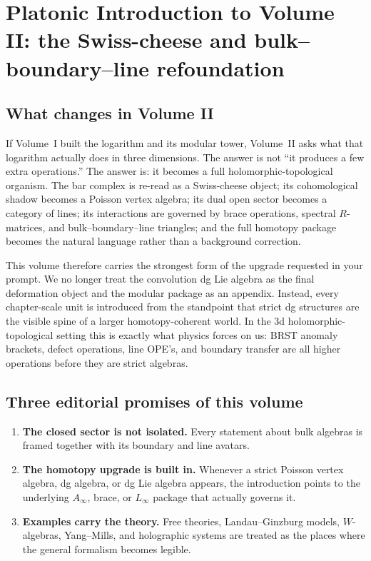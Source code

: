 
\chapter*{Platonic Introduction to Volume II: the Swiss-cheese and bulk--boundary--line refoundation}

\section*{What changes in Volume II}

If Volume~I built the logarithm and its modular tower, Volume~II asks what that logarithm actually does in three dimensions.  The answer is not ``it produces a few extra operations.''  The answer is: it becomes a full holomorphic-topological organism.  The bar complex is re-read as a Swiss-cheese object; its cohomological shadow becomes a Poisson vertex algebra; its dual open sector becomes a category of lines; its interactions are governed by brace operations, spectral $R$-matrices, and bulk--boundary--line triangles; and the full homotopy package becomes the natural language rather than a background correction.

This volume therefore carries the strongest form of the upgrade requested in your prompt.  We no longer treat the convolution dg Lie algebra as the final deformation object and the modular package as an appendix.  Instead, every chapter-scale unit is introduced from the standpoint that strict dg structures are the visible spine of a larger homotopy-coherent world.  In the 3d holomorphic-topological setting this is exactly what physics forces on us: BRST anomaly brackets, defect operations, line OPE's, and boundary transfer are all higher operations before they are strict algebras.

\section*{Three editorial promises of this volume}

\begin{enumerate}
\item \textbf{The closed sector is not isolated.}  Every statement about bulk algebras is framed together with its boundary and line avatars.
\item \textbf{The homotopy upgrade is built in.}  Whenever a strict Poisson vertex algebra, dg algebra, or dg Lie algebra appears, the introduction points to the underlying $A_\infty$, brace, or $L_\infty$ package that actually governs it.
\item \textbf{Examples carry the theory.}  Free theories, Landau--Ginzburg models, $W$-algebras, Yang--Mills, and holographic systems are treated as the places where the general formalism becomes legible.
\end{enumerate}

